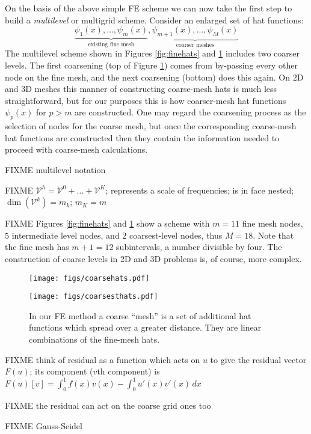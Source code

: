 \documentclass[letterpaper,final,12pt,reqno]{amsart}
\begin{document}
On the basis of the above simple FE scheme we can now take the first step to build a \emph{multilevel} or multigrid scheme.  Consider an enlarged set of hat functions:
    $$\underbrace{\psi_1(x),\dots,\psi_m(x)}_{\text{existing fine mesh}},\underbrace{\psi_{m+1}(x),\dots,\psi_M(x)}_{\text{coarser meshes}}$$
The multilevel scheme shown in Figures \ref{fig:finehats} and \ref{fig:coarsehats} includes two coarser levels.  The first coarsening (top of Figure \ref{fig:coarsehats}) comes from by-passing every other node on the fine mesh, and the next coarsening (bottom) does this again.  On 2D and 3D meshes this manner of constructing coarse-mesh hats is much less straightforward, but for our purposes this is how coarser-mesh hat functions $\psi_p(x)$ for $p>m$ are constructed.  One may regard the coarsening process as the selection of nodes for the coarse mesh, but once the corresponding coarse-mesh hat functions are constructed then they contain the information needed to proceed with coarse-mesh calculations.

FIXME multilevel notation

FIXME $\mathcal{V}^h = \mathcal{V}^0 + \dots + \mathcal{V}^K$; represents a scale of frequencies; is in face nested; $\dim(\mathcal{V}^k) = m_k$; $m_K=m$

FIXME Figures \ref{fig:finehats} and \ref{fig:coarsehats} show a scheme with $m=11$ fine mesh nodes, $5$ intermediate level nodes, and $2$ coarsest-level nodes, thus $M=18$.  Note that the fine mesh has $m+1=12$ subintervals, a number divisible by four.  The construction of coarse levels in 2D and 3D problems is, of course, more complex.

\begin{figure}
\texttt{[image: figs/coarsehats.pdf]}
\smallskip

\texttt{[image: figs/coarsesthats.pdf]}
\caption{In our FE method a coarse ``mesh'' is a set of additional hat functions which spread over a greater distance.  They are linear combinations of the fine-mesh hats.}
\label{fig:coarsehats}
\end{figure}

FIXME think of residual as a function which acts on $u$ to give the residual vector $F(u)$; its component ($v$th component) is $F(u)[v]=\int_0^1 f(x) v(x) - \int_0^1 u'(x)v'(x)\,dx$

FIXME the residual can act on the coarse grid ones too

FIXME Gauss-Seidel
\end{document}
